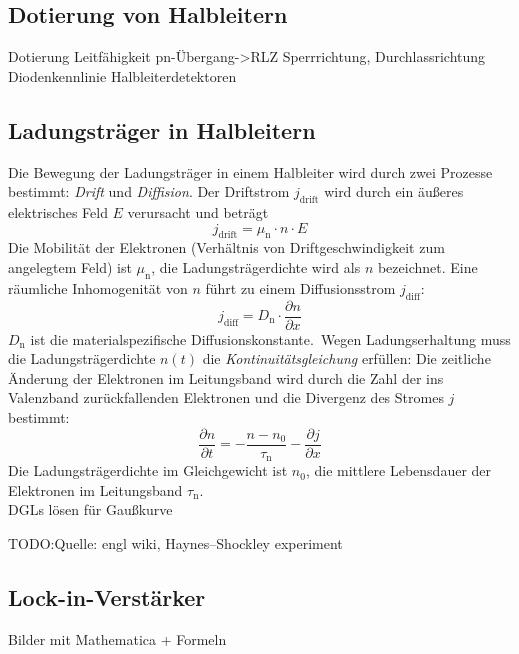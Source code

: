 \subsection{Dotierung von Halbleitern}

Dotierung Leitfähigkeit
pn-Übergang->RLZ
Sperrrichtung, Durchlassrichtung
Diodenkennlinie
Halbleiterdetektoren


\subsection{Ladungsträger in Halbleitern}

Die Bewegung der Ladungsträger in einem Halbleiter wird durch zwei Prozesse bestimmt:
\emph{Drift} und \emph{Diffision}.
Der Driftstrom $j_{\text{drift}}$ wird durch ein äußeres elektrisches Feld $E$ verursacht
und beträgt
\begin{equation}
\label{}
j_{\text{drift}}=\mu_{\text{n}} \cdot n \cdot E
\end{equation}
Die Mobilität der Elektronen (Verhältnis von Driftgeschwindigkeit zum angelegtem Feld) ist $\mu_{\text{n}}$,
die Ladungsträgerdichte wird als $n$ bezeichnet.
Eine räumliche Inhomogenität von $n$ führt zu einem Diffusionsstrom $j_{\text{diff}}$:
\begin{equation}
\label{}
j_{\text{diff}}=D_{\text{n}} \cdot \frac{\partial n}{\partial x}
\end{equation}
$D_{\text{n}}$ ist die materialspezifische Diffusionskonstante.\
Wegen Ladungserhaltung muss die Ladungsträgerdichte $n(t)$ die \emph{Kontinuitätsgleichung} erfüllen:
Die zeitliche Änderung der Elektronen im Leitungsband wird durch die Zahl der ins Valenzband
zurückfallenden Elektronen und die Divergenz des Stromes $j$ bestimmt:
\begin{equation}
\label{}
\frac{\partial n}{\partial t}= -\frac{n-n_0}{\tau_{\text{n}}}-\frac{\partial j}{\partial x}
\end{equation}
Die Ladungsträgerdichte im Gleichgewicht ist $n_0$, die mittlere Lebensdauer der Elektronen
im Leitungsband $\tau_{\text{n}}$.\\


DGLs lösen für Gaußkurve



TODO:Quelle: engl wiki, Haynes–Shockley experiment



\subsection{Lock-in-Verstärker}


Bilder mit Mathematica + Formeln
